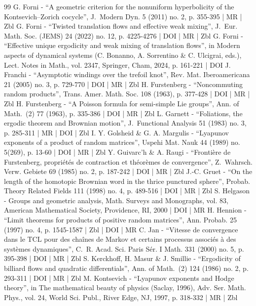 \begin{thebibliography}{99}
G. Forni - “A geometric criterion for the nonuniform hyperbolicity of the Kontsevich–Zorich cocycle”, J. Modern Dyn. 5 (2011) no. 2, p. 355-395 | MR | Zbl
G. Forni - “Twisted translation flows and effective weak mixing”, J. Eur. Math. Soc. (JEMS) 24 (2022) no. 12, p. 4225-4276 | DOI | MR | Zbl
G. Forni - “Effective unique ergodicity and weak mixing of translation flows”, in Modern aspects of dynamical systems (C. Bonanno, A. Sorrentino \& C. Ulcigrai, eds.), Lect. Notes in Math., vol. 2347, Springer, Cham, 2024, p. 161-221 | DOI
J. Franchi - “Asymptotic windings over the trefoil knot”, Rev. Mat. Iberoamericana 21 (2005) no. 3, p. 729-770 | DOI | MR | Zbl
H. Furstenberg - “Noncommuting random products”, Trans. Amer. Math. Soc. 108 (1963), p. 377-428 | DOI | MR | Zbl
H. Furstenberg - “A Poisson formula for semi-simple Lie groups”, Ann. of Math. (2) 77 (1963), p. 335-386 | DOI | MR | Zbl
L. Garnett - “Foliations, the ergodic theorem and Brownian motion”, J. Functional Analysis 51 (1983) no. 3, p. 285-311 | MR | DOI | Zbl
I. Y. Golsheid \& G. A. Margulis - “Lyapunov exponents of a product of random matrices”, Uspehi Mat. Nauk 44 (1989) no. 5(269), p. 13-60 | DOI | MR | Zbl
Y. Guivarc’h \& A. Raugi - “Frontière de Furstenberg, propriétés de contraction et théorèmes de convergence”, Z. Wahrsch. Verw. Gebiete 69 (1985) no. 2, p. 187-242 | DOI | MR | Zbl
J.-C. Gruet - “On the length of the homotopic Brownian word in the thrice punctured sphere”, Probab. Theory Related Fields 111 (1998) no. 4, p. 489-516 | DOI | MR | Zbl
S. Helgason - Groups and geometric analysis, Math. Surveys and Monographs, vol. 83, American Mathematical Society, Providence, RI, 2000 | DOI | MR
H. Hennion - “Limit theorems for products of positive random matrices”, Ann. Probab. 25 (1997) no. 4, p. 1545-1587 | Zbl | DOI | MR
C. Jan - “Vitesse de convergence dans le TCL pour des chaînes de Markov et certains processus associés à des systèmes dynamiques”, C. R. Acad. Sci. Paris Sér. I Math. 331 (2000) no. 5, p. 395-398 | DOI | MR | Zbl
S. Kerckhoff, H. Masur \& J. Smillie - “Ergodicity of billiard flows and quadratic differentials”, Ann. of Math. (2) 124 (1986) no. 2, p. 293-311 | DOI | MR | Zbl
M. Kontsevich - “Lyapunov exponents and Hodge theory”, in The mathematical beauty of physics (Saclay, 1996), Adv. Ser. Math. Phys., vol. 24, World Sci. Publ., River Edge, NJ, 1997, p. 318-332 | MR | Zbl

\end{thebibliography}
